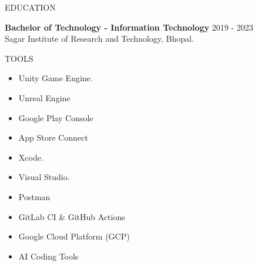 \documentclass{resume} %
\begin{document}

\begin{rSection}{EDUCATION}

\textbf{Bachelor of Technology - Information Technology} \hfill 2019 - 2023\\
Sagar Institute of Research and Technology, Bhopal.

\end{rSection}


\begin{rSection}{TOOLS}

\begin{itemize}
    \itemsep -3pt {}
     \item Unity Game Engine.
     \item Unreal Engine
     \item Google Play Console
     \item App Store Connect
     \item Xcode.
     \item Visual Studio.
     \item Postman
     \item GitLab CI \& GitHub Actions
     \item Google Cloud Platform (GCP)
     \item AI Coding Tools
\end{itemize}

\end{rSection}
\end{document}
